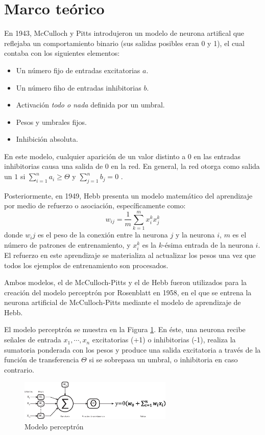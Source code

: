 \documentclass[journal]{IEEEtran}
\begin{document}
\section{Marco teórico}
\label{sec:marco_teorico}
En 1943, McCulloch y Pitts introdujeron un modelo de neurona artifical que reflejaba un comportamiento binario (sus salidas posibles eran 0 y 1), el cual contaba con los siguientes elementos:
\begin{itemize}
	\item Un número fijo de entradas excitatorias $a$.
	\item Un número fiho de entradas inhibitorias $b$.
	\item Activación \emph{todo o nada} definida por un umbral.
	\item Pesos y umbrales fijos.
	\item Inhibición absoluta.
\end{itemize}
En este modelo, cualquier aparición de un valor distinto a $0$ en las entradas inhibitorias causa una salida de $0$ en la red.
En general, la red otorga como salida un $1$ si $\sum_{i=1}^{n} a_i \ge \Theta $ y $\sum_{j=1}^{n} b_j = 0$ .


Posteriormente, en 1949, Hebb presenta un modelo matemático del aprendizaje por medio de refuerzo o asociación, específicamente como:
\begin{equation}
w_{ij} = \frac{1}{m}\sum_{k=1}^{m}x_i^k x_j^k
\end{equation}
donde $w_ij$ es el peso de la conexión entre la neurona $j$ y la neurona $i$, $m$ es el número de patrones de entrenamiento, y $x_i^k$ es la $k$-ésima entrada de la neurona $i$.
El refuerzo en este aprendizaje se materializa al actualizar los pesos una vez que todos los ejemplos de entrenamiento son procesados.


Ambos modelos, el de McCulloch-Pitts y el de Hebb fueron utilizados para la creación del modelo perceptrón por Rosenblatt en 1958, en el que se entrena la neurona artificial de McCulloch-Pitts mediante el modelo de aprendizaje de Hebb.

El modelo perceptrón se muestra en la Figura \ref{fig:perceptron-rna}.
En éste, una neurona recibe señales de entrada $x_1,\cdots,x_n$ excitatorias (+1) o inhibitorias (-1), realiza la sumatoria ponderada con los pesos y produce una salida excitatoria a través de la función de transferencia $\Theta$ si se sobrepasa un umbral, o inhibitoria en caso contrario.

\begin{figure}[tb]
	\centering
	\includegraphics[width=0.65\textwidth]{imagenes/rna}
	\caption{Modelo perceptrón}
	\label{fig:perceptron-rna}
\end{figure}
\end{document}
